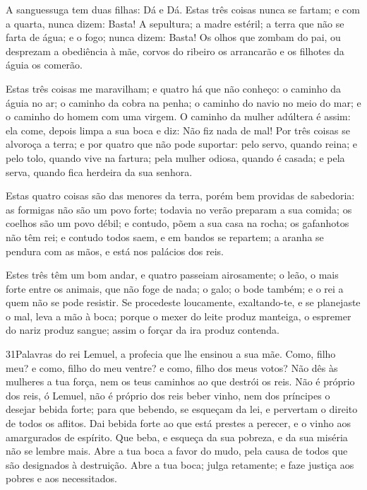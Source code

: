 A sanguessuga tem duas filhas: Dá e Dá. Estas três coisas nunca
se fartam; e com a quarta, nunca dizem: Basta! A sepultura; a
madre estéril; a terra que não se farta de água; e o fogo; nunca
dizem: Basta! Os olhos que zombam do pai, ou desprezam a
obediência à mãe, corvos do ribeiro os arrancarão e os filhotes da
águia os comerão.

Estas três coisas me maravilham; e quatro há que não conheço:
o caminho da águia no ar; o caminho da cobra na penha; o
caminho do navio no meio do mar; e o caminho do homem com uma
virgem. O caminho da mulher adúltera é assim: ela come,
depois limpa a sua boca e diz: Não fiz nada de mal! Por três
coisas se alvoroça a terra; e por quatro que não pode suportar:
pelo servo, quando reina; e pelo tolo, quando vive na
fartura; pela mulher odiosa, quando é casada; e pela serva,
quando fica herdeira da sua senhora.

Estas quatro coisas são das menores da terra, porém bem providas
de sabedoria: as formigas não são um povo forte; todavia no
verão preparam a sua comida; os coelhos são um povo débil; e
contudo, põem a sua casa na rocha; os gafanhotos não têm rei;
e contudo todos saem, e em bandos se repartem; a aranha se
pendura com as mãos, e está nos palácios dos reis.

Estes três têm um bom andar, e quatro passeiam airosamente;
o leão, o mais forte entre os animais, que não foge de nada;
o galo; o bode também; e o rei a quem não se pode resistir.
Se procedeste loucamente, exaltando-te, e se planejaste o
mal, leva a mão à boca; porque o mexer do leite produz
manteiga, o espremer do nariz produz sangue; assim o forçar da ira
produz contenda.

\medskip

\lettrine{31}{}Palavras do rei Lemuel, a profecia que lhe
ensinou a sua mãe. Como, filho meu? e como, filho do meu ventre?
e como, filho dos meus votos? Não dês às mulheres a tua força,
nem os teus caminhos ao que destrói os reis. Não é próprio dos
reis, ó Lemuel, não é próprio dos reis beber vinho, nem dos
príncipes o desejar bebida forte; para que bebendo, se esqueçam
da lei, e pervertam o direito de todos os aflitos. Dai bebida
forte ao que está prestes a perecer, e o vinho aos amargurados de
espírito. Que beba, e esqueça da sua pobreza, e da sua miséria
não se lembre mais. Abre a tua boca a favor do mudo, pela causa
de todos que são designados à destruição. Abre a tua boca; julga
retamente; e faze justiça aos pobres e aos necessitados.

